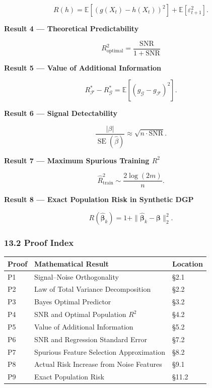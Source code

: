 \[R(h)
=
\mathbb E[(g(X_t)-h(X_t))^2]
+
\mathbb E[\varepsilon_{t+1}^2].\]

\textbf{Result 4 --- Theoretical Predictability}

\[\boxed{
R_{\mathrm{optimal}}^2
=
\frac{\mathrm{SNR}}{1+\mathrm{SNR}}
}\]

\textbf{Result 5 --- Value of Additional Information}

\[R_{\mathcal F}^*-R_{\mathcal G}^*
=
\mathbb E[(g_{\mathcal G}-g_{\mathcal F})^2].\]

\textbf{Result 6 --- Signal Detectability}

\[\frac{|\beta|}{\operatorname{SE}(\hat\beta)}
\approx\sqrt{n\cdot\mathrm{SNR}}.\]

\textbf{Result 7 --- Maximum Spurious Training \(R^2\)}

\[\widehat R^2_{\mathrm{train}}
\sim\frac{2\log(2m)}{n}.\]

\textbf{Result 8 --- Exact Population Risk in Synthetic DGP}

\[R(\hat{\boldsymbol\beta}_k)
=
1+
\|\hat{\boldsymbol\beta}_k-\boldsymbol\beta\|_2^2.\]

\hypertarget{part-4-60-0001-proof-index}{%
\subsubsection{13.2 Proof Index}\label{part-4-60-0001-proof-index}}

\begin{readertable}
\begin{longtable}[]{@{}
  >{\raggedright\arraybackslash}p{}
  >{\raggedright\arraybackslash}p{}
  >{\raggedright\arraybackslash}p{}@{}}
\toprule
Proof & Mathematical Result & Location \\
\midrule
\endhead
P1 & Signal--Noise Orthogonality & §2.1 \\
P2 & Law of Total Variance Decomposition & §2.2 \\
P3 & Bayes Optimal Predictor & §3.2 \\
P4 & SNR and Optimal Population \(R^2\) & §4.2 \\
P5 & Value of Additional Information & §5.2 \\
P6 & SNR and Regression Standard Error & §7.2 \\
P7 & Spurious Feature Selection Approximation & §8.2 \\
P8 & Actual Risk Increase from Noise Features & §9.1 \\
P9 & Exact Population Risk & §11.2 \\
\bottomrule
\end{longtable}
\end{readertable}

